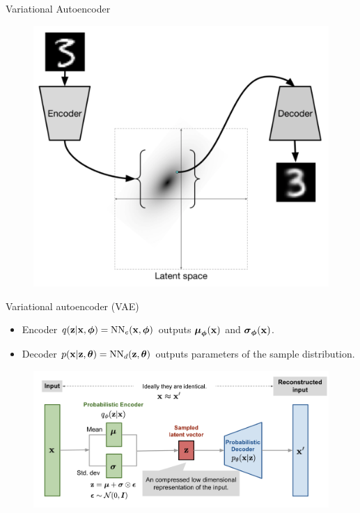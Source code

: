 \begin{frame}{Variational Autoencoder}
	\begin{figure}[h]
		\centering
		\includegraphics[width=.7\linewidth]{figs/VAE.png}
	\end{figure}
\end{frame}
\begin{frame}{Variational autoencoder (VAE)}
	\begin{itemize}
		\item Encoder $q(\mathbf{z} | \mathbf{x}, \boldsymbol{\phi}) = \text{NN}_e(\mathbf{x}, \boldsymbol{\phi})$ outputs $\boldsymbol{\mu}_{\boldsymbol{\phi}}(\mathbf{x})$ and $\boldsymbol{\sigma}_{\boldsymbol{\phi}}(\mathbf{x})$.
		\item Decoder $p(\mathbf{x} | \mathbf{z}, \boldsymbol{\theta}) = \text{NN}_d(\mathbf{z}, \boldsymbol{\theta})$ outputs parameters of the sample distribution.
	\end{itemize}
	\begin{figure}[h]
		\centering
		\includegraphics[width=\linewidth]{figs/vae-gaussian.png}
	\end{figure}
	
\end{frame}
